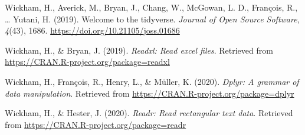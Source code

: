 \documentclass[
  english,
  man]{apa6}
\begin{document}
\leavevmode\hypertarget{ref-R-tidyverse}{}%
Wickham, H., Averick, M., Bryan, J., Chang, W., McGowan, L. D., François, R., \ldots{} Yutani, H. (2019). Welcome to the tidyverse. \emph{Journal of Open Source Software}, \emph{4}(43), 1686. \url{https://doi.org/10.21105/joss.01686}

\leavevmode\hypertarget{ref-R-readxl}{}%
Wickham, H., \& Bryan, J. (2019). \emph{Readxl: Read excel files}. Retrieved from \url{https://CRAN.R-project.org/package=readxl}

\leavevmode\hypertarget{ref-R-dplyr}{}%
Wickham, H., François, R., Henry, L., \& Müller, K. (2020). \emph{Dplyr: A grammar of data manipulation}. Retrieved from \url{https://CRAN.R-project.org/package=dplyr}

\leavevmode\hypertarget{ref-R-readr}{}%
Wickham, H., \& Hester, J. (2020). \emph{Readr: Read rectangular text data}. Retrieved from \url{https://CRAN.R-project.org/package=readr}

\endgroup
\end{document}
